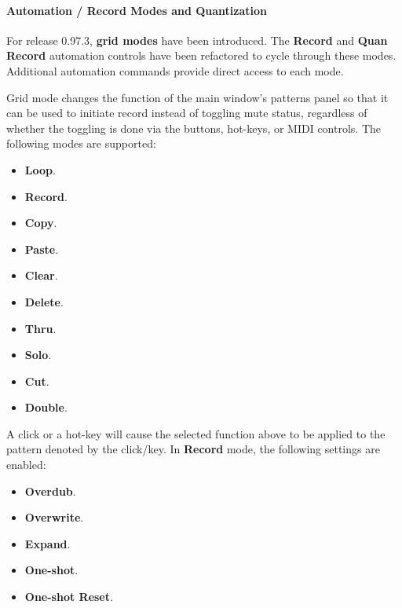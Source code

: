\paragraph{Automation / Record Modes and Quantization}
\label{paragraph:configuration_midi_record_quan}

   For release 0.97.3,
   \textbf{grid modes} have been introduced.
   The \textbf{Record} and \textbf{Quan Record} automation controls have been
   refactored to cycle through these modes.
   Additional automation commands provide direct access to each mode.

   Grid mode changes the function of the main window's patterns panel so that
   it can be used to initiate record instead of toggling mute status,
   regardless of whether the toggling is done via the buttons, hot-keys, or
   MIDI controls.  The following modes are supported:

   \begin{itemize}
      \item \textbf{Loop}.
      \item \textbf{Record}.
      \item \textbf{Copy}.
      \item \textbf{Paste}.
      \item \textbf{Clear}.
      \item \textbf{Delete}.
      \item \textbf{Thru}.
      \item \textbf{Solo}.
      \item \textbf{Cut}.
      \item \textbf{Double}.
   \end{itemize}

   A click or a hot-key will cause the selected function above to be applied to
   the pattern denoted by the click/key.
   In \textbf{Record} mode, the following settings are enabled:

   \begin{itemize}
      \item \textbf{Overdub}.
      \item \textbf{Overwrite}.
      \item \textbf{Expand}.
      \item \textbf{One-shot}.
      \item \textbf{One-shot Reset}.
   \end{itemize}

